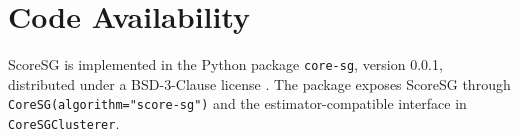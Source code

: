 \documentclass[11pt]{article}
\begin{document}
\section*{Code Availability}

ScoreSG is implemented in the Python package \texttt{core-sg}, version 0.0.1, distributed under a BSD-3-Clause license \citep{coresgsoftware}. The package exposes ScoreSG through \texttt{CoreSG(algorithm="score-sg")} and the estimator-compatible interface in \texttt{CoreSGClusterer}.




\end{document}
